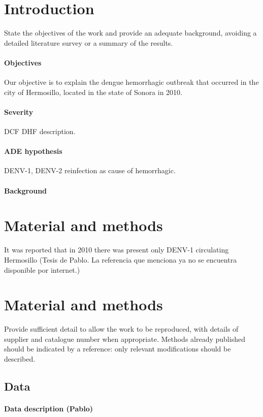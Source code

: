 \documentclass[draft, openbib]{imammb}
\numberwithin{equation}{section}
\begin{document}
    \section{Introduction} \label{intro}
        State the objectives of the work and provide an adequate 
        background, avoiding a detailed literature survey or a 
        summary of the results.
%
        \paragraph{Objectives}
        Our objective is to explain the dengue hemorrhagic outbreak that 
     occurred in the city of Hermosillo, located in the state of Sonora in 2010.
    \paragraph{Severity}
    \ac{DCF} 
    \ac{DHF} description.
    \paragraph{ADE hypothesis}
     \ac{DENV-1}, \ac{DENV-2}
     reinfection as cause of hemorrhagic.
        \paragraph{Background}
        
    \section{Material and methods}

            It was reported that in 2010 there was present only DENV-1 circulating
        Hermosillo (Tesis de Pablo. La referencia que menciona ya no se encuentra
        disponible por internet.)  
        \section{Material and methods}
        Provide sufficient detail to allow the work to be 
        reproduced, with details of supplier and catalogue 
        number when appropriate. Methods already published 
        should be indicated by a reference: only relevant 
        modifications should be described.
        \subsection{Data}
            \paragraph{Data description (Pablo)}
\end{document}
